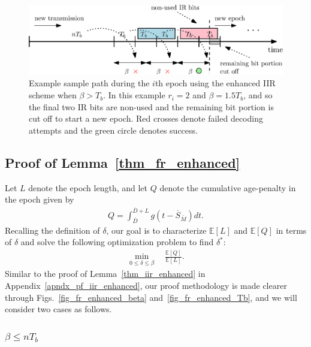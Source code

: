 \documentclass[12pt,journal,onecolumn]{IEEEtran}
\begin{document}
\begin{figure}[t]
\center
\includegraphics[scale=.5]{iir_enhanced_Tb}
\caption{Example sample path during the $i$th epoch using the enhanced IIR scheme when $\beta>T_b$. In this example $r_i=2$ and $\beta=1.5T_b$, and so the final two IR bits are non-used and the remaining bit portion is cut off to start a new epoch. Red crosses denote failed decoding attempts and the green circle denotes success.}
\label{fig_iir_enhanced_Tb}
\end{figure}


\subsection{Proof of Lemma~\ref{thm_fr_enhanced}} \label{apndx_pf_fr_enhanced}

Let $L$ denote the epoch length, and let $Q$ denote the cumulative age-penalty in the epoch given by
\begin{align}
Q=\int_{\overline{D}}^{\overline{D}+L}g\left(t-\overline{S}_{\bar{M}}\right)dt.
\end{align}
Recalling the definition of $\delta$, our goal is to characterize $\mathbb{E}[L]$ and $\mathbb{E}[Q]$ in terms of $\delta$ and solve the following optimization problem to find $\delta^*$:
\begin{align} \label{opt_fr_enhanced}
\min_{0\leq\delta\leq\beta}\quad\frac{\mathbb{E}[Q]}{\mathbb{E}[L]}.
\end{align}
Similar to the proof of Lemma~\ref{thm_iir_enhanced} in Appendix~\ref{apndx_pf_iir_enhanced}, our proof methodology is made clearer through Figs.~\ref{fig_fr_enhanced_beta} and~\ref{fig_fr_enhanced_Tb}, and we will consider two cases as follows.

\subsubsection{$\beta\leq nT_b$}
\end{document}

